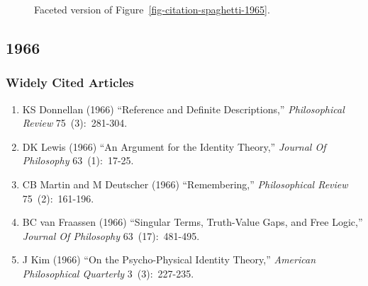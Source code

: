 \documentclass[
  10pt,
  letterpaper,
  DIV=11,
  numbers=noendperiod,
  twoside]{scrartcl}
\providecommand{\tightlist}{%
  \setlength{\itemsep}{0pt}\setlength{\parskip}{0pt}}\usepackage{longtable,booktabs,array}
\begin{document}
\begin{figure}


\caption{\label{fig-citation-facet-1965}Faceted version of
Figure~\ref{fig-citation-spaghetti-1965}.}

\end{figure}%

\newpage

\subsection{1966}\label{sec-s1966}

\subsubsection*{Widely Cited Articles}\label{widely-cited-articles-9}

\begin{enumerate}
\def\labelenumi{\arabic{enumi}.}
\tightlist
\item
  KS Donnellan (1966) ``Reference and Definite Descriptions,''
  \emph{Philosophical Review} 75~(3):~281-304.
\item
  DK Lewis (1966) ``An Argument for the Identity Theory,'' \emph{Journal
  Of Philosophy} 63~(1):~17-25.
\item
  CB Martin and M Deutscher (1966) ``Remembering,'' \emph{Philosophical
  Review} 75~(2):~161-196.
\item
  BC van Fraassen (1966) ``Singular Terms, Truth-Value Gaps, and Free
  Logic,'' \emph{Journal Of Philosophy} 63~(17):~481-495.
\item
  J Kim (1966) ``On the Psycho-Physical Identity Theory,''
  \emph{American Philosophical Quarterly} 3~(3):~227-235.
\end{enumerate}
\end{document}
